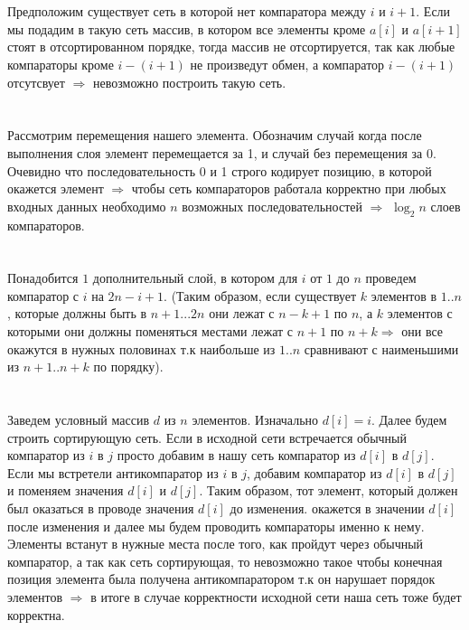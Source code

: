 \documentclass{article}
\begin{document}
\begin{flushleft}

\section{}

Предположим существует сеть в которой нет компаратора между $i$ и $i + 1$. Если мы подадим в такую сеть массив, в котором все элементы кроме $a[i]$ и $a[i + 1]$ стоят в отсортированном порядке, тогда массив не отсортируется, так как любые компараторы кроме $i - (i + 1)$ не произведут обмен, а компаратор $i - (i + 1)$ отсутсвует $\Rightarrow$ невозможно построить такую сеть.

\section{}

Рассмотрим перемещения нашего элемента. Обозначим случай когда после выполнения слоя элемент перемещается за 1, и случай без перемещения за 0. Очевидно что последовательность 0 и 1 строго кодирует позицию, в которой окажется элемент $\Rightarrow$ чтобы сеть компараторов работала корректно при любых входных данных необходимо $n$ возможных последовательностей $\Rightarrow$ $\log_2{n}$ слоев компараторов.

\section{}

Понадобится $1$ дополнительный слой, в котором для $i$ от $1$ до $n$ проведем компаратор с $i$ на $2n - i + 1$. (Таким образом, если существует $k$ элементов в $1..n$, которые должны быть в $n + 1...2n$ они лежат с $n - k + 1$ по $n$, а $k$ элементов с которыми они должны поменяться местами лежат с $n + 1$ по $n + k \Rightarrow$ они все окажутся в нужных половинах т.к наибольше из $1..n$ сравнивают с наименьшими из $n + 1..n + k$ по порядку).

\section{}

Заведем условный массив $d$ из $n$ элементов. Изначально $d[i] = i$. Далее будем строить сортирующую сеть. Если в исходной сети встречается обычный компаратор из $i$ в $j$ просто добавим в нашу сеть компаратор из $d[i]$ в $d[j]$. Если мы встретели антикомпаратор из $i$ в $j$, добавим компаратор из $d[i]$ в $d[j]$ и поменяем значения $d[i]$ и $d[j]$. Таким образом, тот элемент, который должен был оказаться в проводе значения $d[i]$ до изменения. окажется в значении $d[i]$ после изменения и далее мы будем проводить компараторы именно к нему. Элементы встанут в нужные места после того, как пройдут через обычный компаратор, а так как сеть сортирующая, то невозможно такое чтобы конечная позиция элемента была получена антикомпаратором т.к он нарушает порядок элементов $\Rightarrow$ в итоге в случае корректности исходной сети наша сеть тоже будет корректна.

\section{}



\end{flushleft}
\end{document}
